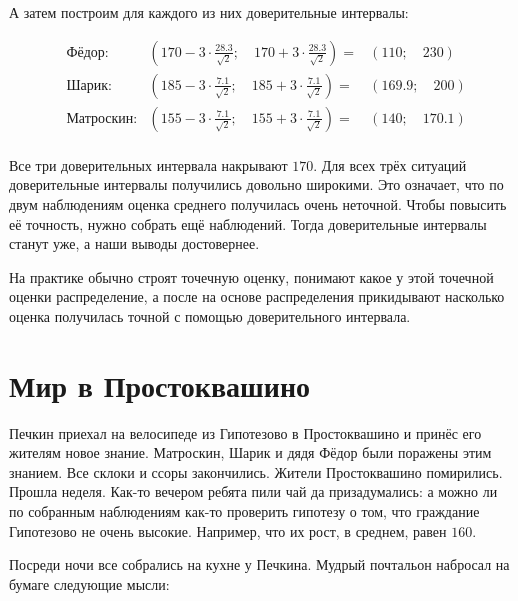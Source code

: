 \documentclass[12pt, a4paper, oneside]{article}
\begin{document}
\begin{sol}
А затем построим для каждого из них  доверительные интервалы: 

\begin{equation*} 
\begin{aligned} 
& \text{Фёдор:}  & \left( 170 -  3 \cdot \frac{28.3}{\sqrt{2}}; \quad 170 + 3 \cdot \frac{28.3}{\sqrt{2}} \right) = &  (110; \quad 230) \\
& \text{Шарик:}  &  \left( 185 -  3 \cdot \frac{7.1}{\sqrt{2}}; \quad 185 + 3 \cdot \frac{7.1}{\sqrt{2}} \right) = &  (169.9; \quad 200) \\
& \text{Матроскин:} &  \left( 155 -  3 \cdot \frac{7.1}{\sqrt{2}}; \quad 155 + 3 \cdot \frac{7.1}{\sqrt{2}} \right) = &  (140; \quad 170.1) \\
\end{aligned}
\end{equation*}

Все три доверительных интервала накрывают $170$.  Для всех трёх ситуаций доверительные интервалы получились довольно широкими. Это означает, что по двум наблюдениям оценка среднего получилась очень неточной. Чтобы повысить её точность, нужно собрать ещё наблюдений. Тогда доверительные интервалы станут уже, а наши выводы достовернее.

На практике обычно строят точечную оценку, понимают какое у этой точечной оценки распределение, а после на основе распределения прикидывают насколько оценка получилась точной с помощью доверительного интервала.
\end{sol} 

\section{Мир в Простоквашино}

Печкин приехал на велосипеде из Гипотезово в Простоквашино и принёс его жителям новое знание. Матроскин, Шарик и дядя Фёдор были поражены этим знанием. Все склоки и ссоры закончились. Жители Простоквашино помирились. Прошла неделя. Как-то вечером ребята пили чай да призадумались: а можно ли по собранным наблюдениям как-то проверить гипотезу о том, что граждание Гипотезово не очень высокие. Например, что их рост, в среднем, равен $160$.

Посреди ночи все собрались на кухне у Печкина. Мудрый почтальон набросал на бумаге следующие мысли: 
\end{document}

